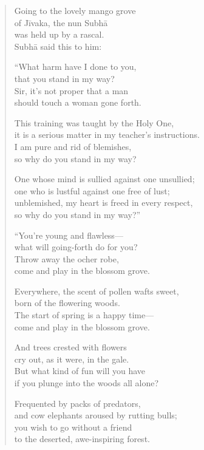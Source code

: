 \documentclass[12pt,openany]{book}%
\begin{document}
\begin{verse}%
Going to the lovely mango grove \\
of \textsanskrit{Jīvaka}, the nun \textsanskrit{Subhā} \\
was held up by a rascal. \\
\textsanskrit{Subhā} said this to him: 

“What harm have I done to you, \\
that you stand in my way? \\
Sir, it’s not proper that a man \\
should touch a woman gone forth. 

This training was taught by the Holy One, \\
it is a serious matter in my teacher’s instructions. \\
I am pure and rid of blemishes, \\
so why do you stand in my way? 

One whose mind is sullied against one unsullied; \\
one who is lustful against one free of lust; \\
unblemished, my heart is freed in every respect, \\
so why do you stand in my way?” 

“You’re young and flawless—\\
what will going-forth do for you? \\
Throw away the ocher robe, \\
come and play in the blossom grove. 

Everywhere, the scent of pollen wafts sweet, \\
born of the flowering woods. \\
The start of spring is a happy time—\\
come and play in the blossom grove. 

And trees crested with flowers \\
cry out, as it were, in the gale. \\
But what kind of fun will you have \\
if you plunge into the woods all alone? 

Frequented by packs of predators, \\
and cow elephants aroused by rutting bulls; \\
you wish to go without a friend \\
to the deserted, awe-inspiring forest. 


\end{verse}
\end{document}
